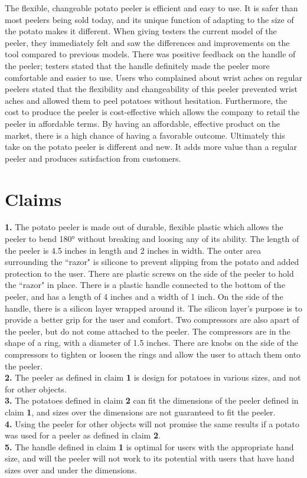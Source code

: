 \documentclass[twocolumn]{article}
\begin{document}
The flexible, changeable potato peeler is efficient and easy to use. It is safer than most peelers being sold today, and its unique function of adapting to the size of the potato makes it different. When giving testers the current model of the peeler, they immediately felt and saw the differences and improvements on the tool compared to previous models. There was positive feedback on the handle of the peeler; testers stated that the handle definitely made the peeler more comfortable and easier to use. Users who complained about wrist aches on regular peelers stated that the flexibility and changeability of this peeler prevented wrist aches and allowed them to peel potatoes without hesitation. Furthermore, the cost to produce the peeler is cost-effective which allows the company to retail the peeler in affordable terms. By having an affordable, effective product on the market, there is a high chance of having a favorable outcome. Ultimately this take on the potato peeler is different and new. It adds more value than a regular peeler and produces satisfaction from customers. 
\section*{Claims}
\textbf{1.} The potato peeler is made out of durable, flexible plastic which allows the peeler to bend \ang{180} without breaking and loosing any of its ability. The length of the peeler is 4.5 inches in length and 2 inches in width. The outer area surrounding the ``razor" is silicone to prevent slipping from the potato and added protection to the user. There are plastic screws on the side of the peeler to hold the ``razor" in place. There is a plastic handle connected to the bottom of the peeler, and has a length of 4 inches and a width of 1 inch. On the side of the handle, there is a silicon layer wrapped around it. The silicon layer's purpose is to provide a better grip for the user and comfort. Two compressors are also apart of the peeler, but do not come attached to the peeler. The compressors are in the shape of a ring, with a diameter of 1.5 inches. There are knobs on the side of the compressors to tighten or loosen the rings and allow the user to attach them onto the peeler.
\\
\textbf{2.} The peeler as defined in claim \textbf{1} is design for potatoes in various sizes, and not for other objects.
\\
\textbf{3.} The potatoes defined in claim \textbf{2} can fit the dimensions of the peeler defined in claim \textbf{1}, and sizes over the dimensions are not guaranteed to fit the peeler.
\\
\textbf{4.} Using the peeler for other objects will not promise the same results if a potato was used for a peeler as defined in claim \textbf{2}.
\\
\textbf{5.} The handle defined in claim \textbf{1} is optimal for users with the appropriate hand size, and will the peeler will not work to its potential with users that have hand sizes over and under the dimensions.
\pagebreak
\end{document}
